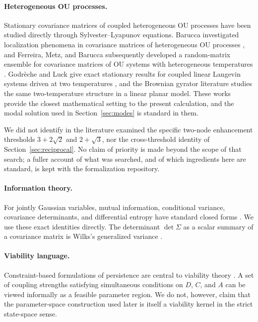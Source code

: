 \documentclass[11pt]{article}
\theoremstyle{plain}
\theoremstyle{remark}
\begin{document}
\paragraph{Heterogeneous OU processes.} Stationary covariance matrices of coupled heterogeneous
OU processes have been studied directly through Sylvester--Lyapunov equations. Barucca
investigated localization phenomena in covariance matrices of heterogeneous OU processes
\cite{Barucca2014}, and Ferreira, Metz, and Barucca subsequently developed a random-matrix
ensemble for covariance matrices of OU systems with heterogeneous temperatures
\cite{FerreiraMetzBarucca2025}. Godr\`eche and Luck give exact stationary results for coupled
linear Langevin systems driven at two temperatures \cite{GodrecheLuck2019}, and the Brownian
gyrator literature \cite{FilligerReimann2007,DotsenkoEtAl2013} studies the same two-temperature
structure in a linear planar model. These works provide the closest mathematical setting to the
present calculation, and the modal solution used in Section~\ref{sec:modes} is standard in
them.

We did not identify in the literature examined the specific two-node enhancement thresholds
$3+2\sqrt2$ and $2+\sqrt3$, nor the cross-threshold identity of Section~\ref{sec:reciprocal}.
No claim of priority is made beyond the scope of that search; a fuller account of what was
searched, and of which ingredients here are standard, is kept with the formalization
repository.

\paragraph{Information theory.} For jointly Gaussian variables, mutual information, conditional
variance, covariance determinants, and differential entropy have standard closed forms
\cite{CoverThomas2005,Lauritzen1996}. We use these exact identities directly. The determinant
$\det\Sigma$ as a scalar summary of a covariance matrix is Wilks's generalized variance
\cite{Wilks1932}.

\paragraph{Viability language.} Constraint-based formulations of persistence are central to
viability theory \cite{Aubin1991}. A set of coupling strengths satisfying simultaneous
conditions on $D$, $C$, and $A$ can be viewed informally as a feasible parameter region. We do
not, however, claim that the parameter-space construction used later is itself a viability
kernel in the strict state-space sense.
\end{document}
